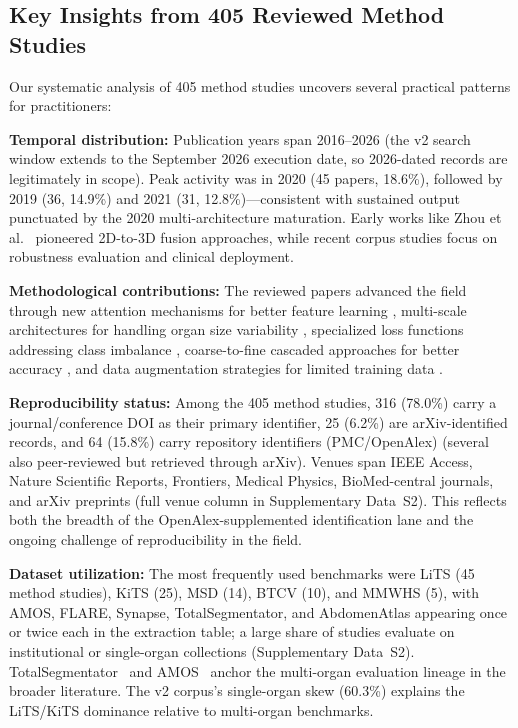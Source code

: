 \subsection{Key Insights from 405 Reviewed Method Studies}

Our systematic analysis of 405 method studies uncovers several practical patterns for practitioners:

\textbf{Temporal distribution:} Publication years span 2016--2026 (the v2 search window extends to the September 2026 execution date, so 2026-dated records are legitimately in scope). Peak activity was in 2020 (45 papers, 18.6\%), followed by 2019 (36, 14.9\%) and 2021 (31, 12.8\%)---consistent with sustained output punctuated by the 2020 multi-architecture maturation. Early works like Zhou et al.\ \cite{zhou2017deep} pioneered 2D-to-3D fusion approaches, while recent corpus studies focus on robustness evaluation and clinical deployment.

\textbf{Methodological contributions:} The reviewed papers advanced the field through new attention mechanisms for better feature learning \cite{liu2020attention, zhu2019anatomynet}, multi-scale architectures for handling organ size variability \cite{zhao2020mss, roth2018cascaded}, specialized loss functions addressing class imbalance \cite{shen2018dice, rister2018iou}, coarse-to-fine cascaded approaches for better accuracy \cite{roth2017hierarchical, lin2021kidney}, and data augmentation strategies for limited training data \cite{pan2023adversarial}.

\textbf{Reproducibility status:} Among the 405 method studies, 316 (78.0\%) carry a journal/conference DOI as their primary identifier, 25 (6.2\%) are arXiv-identified records, and 64 (15.8\%) carry repository identifiers (PMC/OpenAlex) (several also peer-reviewed but retrieved through arXiv). Venues span IEEE Access, Nature Scientific Reports, Frontiers, Medical Physics, BioMed-central journals, and arXiv preprints (full venue column in Supplementary Data~S2). This reflects both the breadth of the OpenAlex-supplemented identification lane and the ongoing challenge of reproducibility in the field.

\textbf{Dataset utilization:} The most frequently used benchmarks were LiTS (45 method studies), KiTS (25), MSD (14), BTCV (10), and MMWHS (5), with AMOS, FLARE, Synapse, TotalSegmentator, and AbdomenAtlas appearing once or twice each in the extraction table; a large share of studies evaluate on institutional or single-organ collections (Supplementary Data~S2). TotalSegmentator~\cite{wasserthal2023totalsegmentator} and AMOS~\cite{amos2022} anchor the multi-organ evaluation lineage in the broader literature. The v2 corpus's single-organ skew (60.3\%) explains the LiTS/KiTS dominance relative to multi-organ benchmarks.

